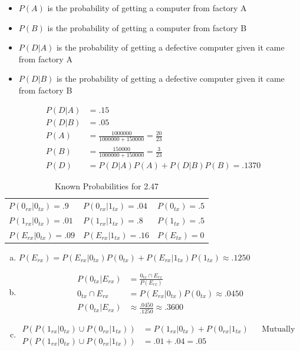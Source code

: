 \documentclass[12pt]{article}
\newenvironment{problem}[2][Problem]{\begin{trivlist}
\item[\hskip \labelsep {\bfseries #1}\hskip \labelsep {\bfseries #2.}]
  \vspace{1 cm}
}{\end{trivlist}}
\begin{document}
\begin{problem}{2.45}
\item
  \begin{itemize}
    \item $P(A)$ is the probability of getting a computer from factory A
    \item $P(B)$ is the probability of getting a computer from factory B
    \item $P(D|A)$ is the probability of getting a defective computer given it came from factory A
    \item $P(D|B)$ is the probability of getting a defective computer given it came from factory B
  \end{itemize}
  \begin{align*}
    P(D|A) &= .15 \\
    P(D|B) &= .05 \\
    P(A) &= \frac{1000000}{1000000 + 150000} = \frac{20}{23} \\
    P(B) &= \frac{150000}{1000000 + 150000} = \frac{3}{23} \\
    P(D) &= P(D|A)P(A) + P(D|B)P(B) = .1370
  \end{align*}
\end{problem}

\begin{problem}{2.47}
\item
    \begin{table}[!htpb]
      \centering
      \caption{Known Probabilities for 2.47}
        \label{probs_2_4}
        \begin{tabular}{lll}
          $P(0_{rx}|0_{tx}) = .9$  & $P(0_{rx}|1_{tx}) = .04$ & $P(0_{tx}) = .5$ \\
          $P(1_{rx}|0_{tx}) = .01$ & $P(1_{rx}|1_{tx}) = .8$  & $P(1_{tx}) = .5$ \\
          $P(E_{rx}|0_{tx}) = .09$ & $P(E_{rx}|1_{tx}) = .16$ & $P(E_{tx}) = 0$ 
        \end{tabular}
    \end{table}
  \begin{enumerate}[a.]
    \item %
            $P(E_{rx}) = P(E_{rx}|0_{tx})P(0_{tx}) + P(E_{rx}|1_{tx})P(1_{tx}) \approx .1250$
    \item %
      \begin{align*}
        P(0_{tx}|E_{rx}) &= \frac{0_{tx} \cap E_{rx}}{P(E_{rx})} \\
        0_{tx} \cap E_{rx} &= P(E_{rx}|0_{tx})P(0_{tx}) \approx .0450 \\
        P(0_{tx}|E_{rx}) &\approx \frac{.0450}{.1250} \approx .3600
      \end{align*}
    \item %
      \begin{align*}
        P(P(1_{rx}|0_{tx})\cup P(0_{rx}|1_{tx})) &= P(1_{rx}|0_{tx}) + P(0_{rx}|1_{tx}) & & \textrm{Mutually exclusive} \\
        P(P(1_{rx}|0_{tx})\cup P(0_{rx}|1_{tx})) &= .01 + .04 = .05 
      \end{align*}
  \end{enumerate}
\end{problem}
\end{document}
